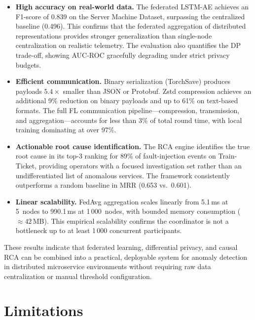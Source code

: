 \begin{itemize}
    \item \textbf{High accuracy on real-world data.} The federated LSTM-AE
    achieves an F1-score of 0.839 on the Server Machine Dataset, surpassing
    the centralized baseline (0.496). This confirms that the federated
    aggregation of distributed representations provides stronger generalization
    than single-node centralization on realistic telemetry.
    The evaluation also quantifies the DP trade-off, showing AUC-ROC gracefully
    degrading under strict privacy budgets.

    \item \textbf{Efficient communication.} Binary serialization (TorchSave)
    produces payloads $5.4\times$ smaller than JSON or Protobuf. Zstd
    compression achieves an additional 9\% reduction on binary payloads and
    up to 61\% on text-based formats. The full FL communication
    pipeline---compression, transmission, and aggregation---accounts for less
    than 3\% of total round time, with local training dominating at over 97\%.

    \item \textbf{Actionable root cause identification.} The RCA engine
    identifies the true root cause in its top-3 ranking for 89\% of
    fault-injection events on Train-Ticket, providing operators with a focused
    investigation set rather than an undifferentiated list of anomalous services.
    The framework consistently outperforms a random baseline in MRR (0.653 vs.\
    0.601).

    \item \textbf{Linear scalability.} FedAvg aggregation scales linearly
    from 5.1\,ms at 5~nodes to 990.1\,ms at 1\,000~nodes, with bounded memory
    consumption ($\approx 42$\,MB). This empirical scalability confirms the
    coordinator is not a bottleneck up to at least 1\,000 concurrent
    participants.
\end{itemize}

These results indicate that federated learning, differential privacy, and
causal RCA can be combined into a practical, deployable system for anomaly
detection in distributed microservice environments without requiring raw data
centralization or manual threshold configuration.

\section{Limitations}
\label{sec:conclusion_limitations}


